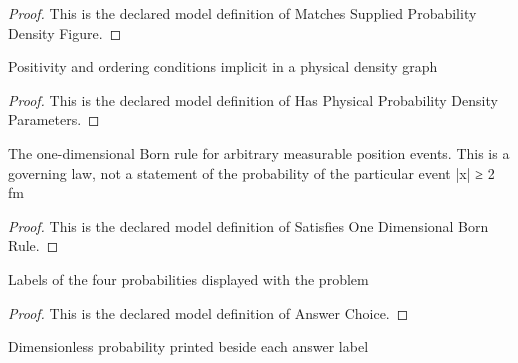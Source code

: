 \begin{proof}
  This is the declared model definition of Matches Supplied Probability Density Figure.
\end{proof}
\begin{definition}
  \label{def:physics:phyx-mini-0503:phyxminiproblems-problemphyxmini0503-hasphysicalprobabilitydensityparameters}
  Positivity and ordering conditions implicit in a physical density graph
\end{definition}
\begin{proof}
  This is the declared model definition of Has Physical Probability Density Parameters.
\end{proof}
\begin{definition}
  \label{def:physics:phyx-mini-0503:phyxminiproblems-problemphyxmini0503-satisfiesonedimensionalbornrule}
  The one-dimensional Born rule for arbitrary measurable position events. This is a governing law, not a statement of the probability of the particular event |x| ≥ 2 fm
\end{definition}
\begin{proof}
  This is the declared model definition of Satisfies One Dimensional Born Rule.
\end{proof}
\begin{definition}
  \label{def:physics:phyx-mini-0503:phyxminiproblems-problemphyxmini0503-answerchoice}
  Labels of the four probabilities displayed with the problem
\end{definition}
\begin{proof}
  This is the declared model definition of Answer Choice.
\end{proof}
\begin{definition}
  \label{def:physics:phyx-mini-0503:phyxminiproblems-problemphyxmini0503-displayedprobability}
  Dimensionless probability printed beside each answer label
\end{definition}
